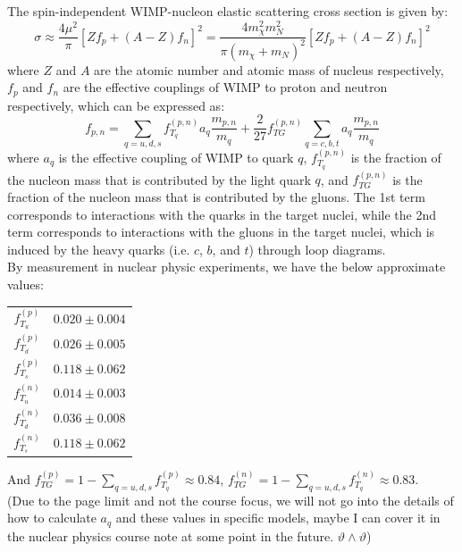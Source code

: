 \begin{theory}
    The spin-independent WIMP-nucleon elastic scattering cross section is given by:
    \[
        \sigma \approx \frac{4 \mu^2}{\pi} \left[ Z f_p + (A-Z) f_n \right]^2 = \frac{4 m_\chi^2 m_N^2}{\pi (m_\chi + m_N)^2} \left[ Z f_p + (A-Z) f_n \right]^2
    \]
    where $Z$ and $A$ are the atomic number and atomic mass of nucleus respectively, $f_p$ and $f_n$ are the effective couplings of WIMP to proton and neutron respectively, which can be expressed as:
    \[
        f_{p,n} = \sum_{q=u,d,s} f_{T_q}^{(p,n)} a_q \frac{m_{p,n}}{m_q} + \frac{2}{27} f_{TG}^{(p,n)} \sum_{q=c,b,t} a_q \frac{m_{p,n}}{m_q}
    \]
    where $a_q$ is the effective coupling of WIMP to quark $q$, $f_{T_q}^{(p,n)}$ is the fraction of the nucleon mass that is contributed by the light quark $q$, and $f_{TG}^{(p,n)}$ is the fraction of the nucleon mass that is contributed by the gluons. The 1st term corresponds to interactions with the quarks in the target nuclei, while the 2nd term corresponds to interactions with the gluons in the target nuclei, which is induced by the heavy quarks (i.e. $c$, $b$, and $t$) through loop diagrams. \\
    
    By measurement in nuclear physic experiments, we have the below approximate values:
    \begin{center}
        \begin{tabular}{c|r}
            \hline
            $f_{T_u}^{(p)}$ & $0.020 \pm 0.004$ \\
            $f_{T_d}^{(p)}$ & $0.026 \pm 0.005$ \\
            $f_{T_s}^{(p)}$ & $0.118 \pm 0.062$ \\
            \hline
            $f_{T_u}^{(n)}$ & $0.014 \pm 0.003$ \\
            $f_{T_d}^{(n)}$ & $0.036 \pm 0.008$ \\
            $f_{T_s}^{(n)}$ & $0.118 \pm 0.062$ \\
            \hline
        \end{tabular}
    \end{center}
    And $f_{TG}^{(p)} = 1 - \sum_{q=u,d,s} f_{T_q}^{(p)} \approx 0.84$, $f_{TG}^{(n)} = 1 - \sum_{q=u,d,s} f_{T_q}^{(n)} \approx 0.83$. \\
    (Due to the page limit and not the course focus, we will not go into the details of how to calculate $a_q$ and these values in specific models, maybe I can cover it in the nuclear physics course note at some point in the future. $\vartheta \wedge \vartheta$)
\end{theory}

